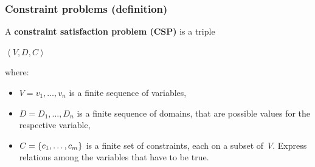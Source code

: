 \documentclass{beamer}
\begin{document}
\begin{frame}
  \frametitle{Constraint problems (definition)}
  \begin{definition}
    A \textbf{constraint satisfaction problem (CSP)} is a 
    triple\\
    \begin{center}
      $\left<V,D,C\right>$\\      
    \end{center}
    where: \\
    \begin{itemize}
      \item $V = v_1, \ldots, v_n$ is a finite sequence of variables,
      \item $D = D_1, \ldots, D_n$ is a finite sequence of domains, that are
        possible values for the respective variable,
      \item $C = \left\{c_1, \ldots, c_m\right\}$ is a finite set of constraints, 
        each on a subset of~$V$. 
        Express relations among the variables that have to be true.
    \end{itemize}
  \end{definition}
\end{frame}
\end{document}
